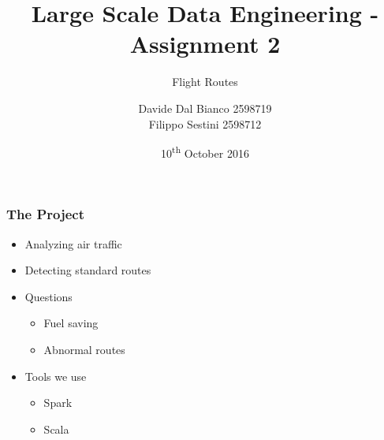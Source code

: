 \documentclass{beamer}
\title{Large Scale Data Engineering - Assignment 2}
\subtitle{Flight Routes}
\author[Group 01]{Davide Dal Bianco 2598719 \\ Filippo Sestini 2598712}
\date{10\textsuperscript{th} October 2016}
\begin{document}
    \begin{frame}
        \maketitle
    \end{frame}

    \begin{frame}
        \frametitle{The Project}
        \begin{itemize}
            \item Analyzing air traffic
            \item Detecting standard routes
            \item Questions
            \begin{itemize}
                \item Fuel saving
                \item Abnormal routes
            \end{itemize}
            \item Tools we use
            \begin{itemize}
                \item Spark
                \item Scala
            \end{itemize}
        \end{itemize}
    \end{frame}
\end{document}
